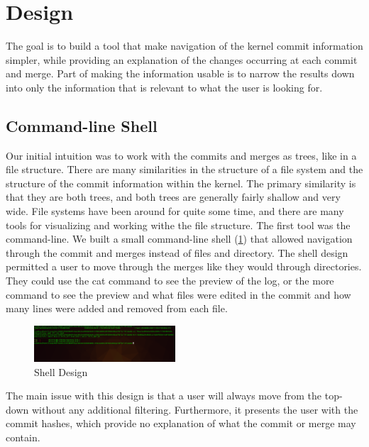 \documentclass[conference, draftclsnofoot]{IEEEtran}
\begin{document}

\section{Design}

The goal is to build a tool that make navigation of the kernel commit
information simpler, while providing an explanation of the changes occurring at
each commit and merge. Part of making the information usable is to narrow the
results down into only the information that is relevant to what the user is
looking for.

\subsection{Command-line Shell}

Our initial intuition was to work with the commits and merges as trees, like in
a file structure. There are many similarities in the structure of a file system
and the structure of the commit information within the kernel. The primary
similarity is that they are both trees, and both trees are generally fairly
shallow and very wide. File systems have been around for quite some time, and
there are many tools for visualizing and working withe the file structure. The
first tool was the command-line. We built a small command-line shell
(\ref{fig:shell}) that allowed navigation through the commit and merges instead
of files and directory. The shell design permitted a user to move through the
merges like they would through directories. They could use the cat command to
see the preview of the log, or the more command to see the preview and what
files were edited in the commit and how many lines were added and removed from
each file.

\begin{figure}[h]
	\centering
	\includegraphics[width=0.47\textwidth]{figures/shell.png}
	\caption{Shell Design}
	\label{fig:shell}
\end{figure}

The main issue with this design is that a user will always move from the
top-down without any additional filtering. Furthermore, it presents the user
with the commit hashes, which provide no explanation of what the commit or
merge may contain.
\end{document}

